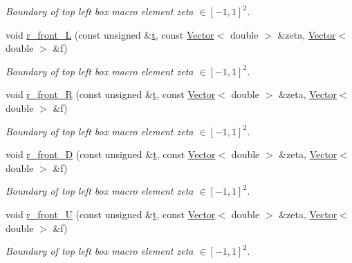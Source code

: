 \begin{DoxyCompactItemize}
\begin{DoxyCompactList}\small\item\em Boundary of top left box macro element zeta $ \in [-1,1]^2 $. \end{DoxyCompactList}\item 
void \hyperlink{classoomph_1_1EighthSphereDomain_a161d1ad8c0e991e9228a0725d7c9ccd9}{r\+\_\+front\+\_\+L} (const unsigned \&\hyperlink{cfortran_8h_af6f0bd3dc13317f895c91323c25c2b8f}{t}, const \hyperlink{classoomph_1_1Vector}{Vector}$<$ double $>$ \&zeta, \hyperlink{classoomph_1_1Vector}{Vector}$<$ double $>$ \&f)
\begin{DoxyCompactList}\small\item\em Boundary of top left box macro element zeta $ \in [-1,1]^2 $. \end{DoxyCompactList}\item 
void \hyperlink{classoomph_1_1EighthSphereDomain_a5d32fe51e8ca993b12f911593ad46ca7}{r\+\_\+front\+\_\+R} (const unsigned \&\hyperlink{cfortran_8h_af6f0bd3dc13317f895c91323c25c2b8f}{t}, const \hyperlink{classoomph_1_1Vector}{Vector}$<$ double $>$ \&zeta, \hyperlink{classoomph_1_1Vector}{Vector}$<$ double $>$ \&f)
\begin{DoxyCompactList}\small\item\em Boundary of top left box macro element zeta $ \in [-1,1]^2 $. \end{DoxyCompactList}\item 
void \hyperlink{classoomph_1_1EighthSphereDomain_a46ccabe44dd16cae048c302d5cfe26ee}{r\+\_\+front\+\_\+D} (const unsigned \&\hyperlink{cfortran_8h_af6f0bd3dc13317f895c91323c25c2b8f}{t}, const \hyperlink{classoomph_1_1Vector}{Vector}$<$ double $>$ \&zeta, \hyperlink{classoomph_1_1Vector}{Vector}$<$ double $>$ \&f)
\begin{DoxyCompactList}\small\item\em Boundary of top left box macro element zeta $ \in [-1,1]^2 $. \end{DoxyCompactList}\item 
void \hyperlink{classoomph_1_1EighthSphereDomain_aef12fa8f21592009e8ab51d88c301388}{r\+\_\+front\+\_\+U} (const unsigned \&\hyperlink{cfortran_8h_af6f0bd3dc13317f895c91323c25c2b8f}{t}, const \hyperlink{classoomph_1_1Vector}{Vector}$<$ double $>$ \&zeta, \hyperlink{classoomph_1_1Vector}{Vector}$<$ double $>$ \&f)
\begin{DoxyCompactList}\small\item\em Boundary of top left box macro element zeta $ \in [-1,1]^2 $. \end{DoxyCompactList}\item 

\end{DoxyCompactItemize}
